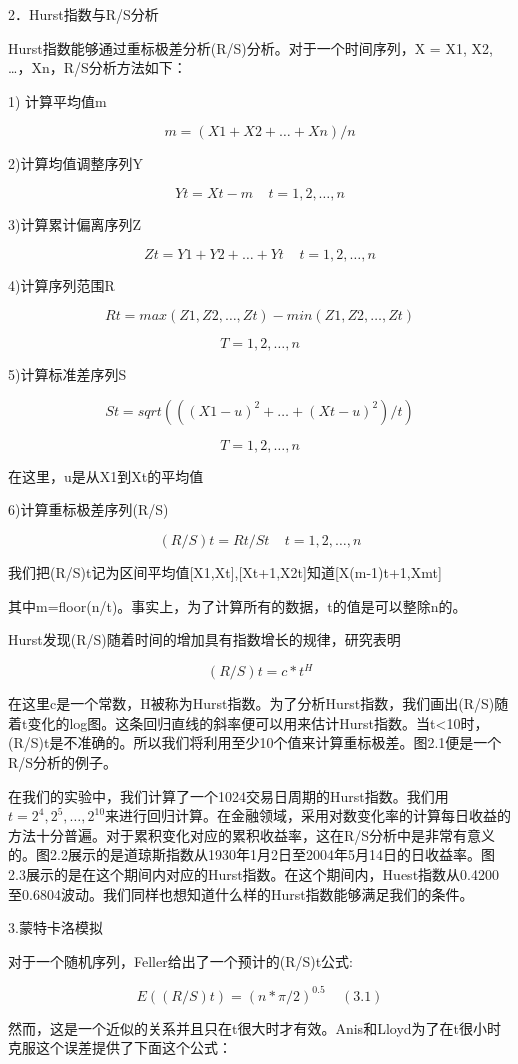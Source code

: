 \documentclass[12pt]{article}
\begin{document}
2．Hurst指数与R/S分析

Hurst指数能够通过重标极差分析(R/S)分析。对于一个时间序列，X = X1, X2, …，Xn，R/S分析方法如下：

1)	计算平均值m

$$m=(X1+X2+…+Xn)/n$$

2)计算均值调整序列Y

	$$Yt=Xt-m~~~~~t=1,2,…,n$$
	
3)计算累计偏离序列Z

$$Zt=Y1+Y2+…+Yt ~~~~~t=1,2,…,n$$

4)计算序列范围R

$$Rt=max(Z1,Z2,…,Zt)-min(Z1,Z2,…,Zt)$$

$$T=1,2,…,n$$

5)计算标准差序列S

	$$St=sqrt(((X1-u)^2+…+(Xt-u)^2)/t)$$
	
	$$T=1,2,…,n$$
	
	在这里，u是从X1到Xt的平均值
	
6)计算重标极差序列(R/S)

	$$(R/S)t=Rt/St~~~~~t=1,2,…,n$$
	
我们把(R/S)t记为区间平均值[X1,Xt],[Xt+1,X2t]知道[X(m-1)t+1,Xmt]

其中m=floor(n/t)。事实上，为了计算所有的数据，t的值是可以整除n的。

Hurst发现(R/S)随着时间的增加具有指数增长的规律，研究表明

	$$(R/S)t=c*t^H$$
	
在这里c是一个常数，H被称为Hurst指数。为了分析Hurst指数，我们画出(R/S)随着t变化的log图。这条回归直线的斜率便可以用来估计Hurst指数。当t<10时，(R/S)t是不准确的。所以我们将利用至少10个值来计算重标极差。图2.1便是一个R/S分析的例子。

在我们的实验中，我们计算了一个1024交易日周期的Hurst指数。我们用$t=2^4,2^5,…,2^10$来进行回归计算。在金融领域，采用对数变化率的计算每日收益的方法十分普遍。对于累积变化对应的累积收益率，这在R/S分析中是非常有意义的。图2.2展示的是道琼斯指数从1930年1月2日至2004年5月14日的日收益率。图2.3展示的是在这个期间内对应的Hurst指数。在这个期间内，Huest指数从0.4200至0.6804波动。我们同样也想知道什么样的Hurst指数能够满足我们的条件。


3.蒙特卡洛模拟

对于一个随机序列，Feller给出了一个预计的(R/S)t公式:

$$E((R/S)t)=(n*\pi/2)^{0.5} ~~~~~ (3.1)$$

然而，这是一个近似的关系并且只在t很大时才有效。Anis和Lloyd为了在t很小时克服这个误差提供了下面这个公式：
\end{document}
